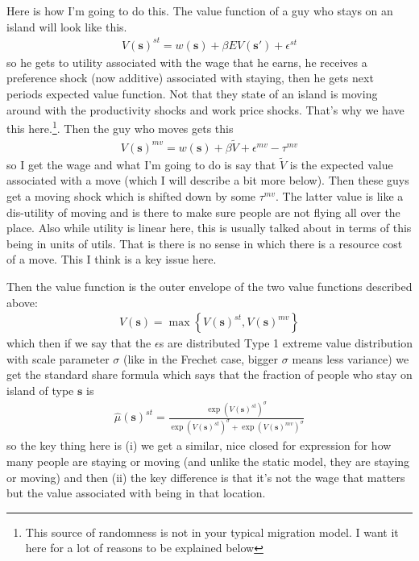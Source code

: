 \documentclass[pdftex,12pt]{article}
\begin{document}
\medskip
\noindent Here is how I'm going to do this. The value function of a guy who stays on an island will look like this.
\begin{align}
V(\textbf{s})^{st} = w(\textbf{s}) + \beta E V(\textbf{s}') + \epsilon^{st}
\label{eq:expected_utility_stay}
\end{align}
so he gets to utility associated with the wage that he earns, he receives a preference shock (now additive) associated with staying, then he gets next periods expected value function. Not that they state of an island is moving around with the productivity shocks and work price shocks. That's why we have this here.\footnote{This source of randomness is not in your typical migration model. I want it here for a lot of reasons to be explained below}. Then the guy who moves gets this
\begin{align}
V(\textbf{s})^{mv} = w(\textbf{s}) + \beta \tilde V + \epsilon^{mv} - \tau^{mv}
\label{eq:expected_utility_move}
\end{align}
so I get the wage and what I'm going to do is say that $\tilde V$ is the expected value associated with a move (which I will describe a bit more below). Then these guys get a moving shock which is shifted down by some $\tau^{mv}$. The latter value is like a dis-utility of moving and is there to make sure people are not flying all over the place. Also while utility is linear here, this is usually talked about in terms of this being in units of utils. That is there is no sense in which there is a resource cost of a move. This I think is a key issue here. 

\medskip
\noindent Then the value function is the outer envelope of the two value functions described above:
\begin{align}
V(\textbf{s}) = \max \left\{ V(\textbf{s})^{st}, V(\textbf{s})^{mv} \right\}
\end{align}
which then if we say that the $\epsilon$s are distributed Type 1 extreme value distribution with scale parameter $\sigma$  (like in the Frechet case, bigger $\sigma$ means less variance) we get the standard share formula which says that the fraction of people who stay on island of type $\textbf{s}$ is
\begin{align}
\hat \mu(\textbf{s})^{st} = \frac{\exp \left( V(\textbf{s})^{st} \right)^{\sigma}}{\exp \left(V(\textbf{s})^{st}\right)^{\sigma} + \exp \left(V(\textbf{s})^{mv}\right)^{\sigma}}
\label{eq:migration_shares}
\end{align}
so the key thing here is (i) we get a similar, nice closed for expression for how many people are staying or moving (and unlike the static model, they are staying or moving) and then (ii) the key difference is that it's not the wage that matters but the value associated with being in that location. 
\end{document}
